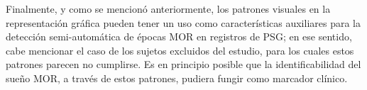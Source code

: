Finalmente, y como se mencionó anteriormente, los patrones visuales en la representación 
gráfica pueden tener un uso como características auxiliares para la detección 
semi-automática de épocas MOR en registros de PSG; en ese sentido, cabe mencionar el caso de 
los sujetos excluidos del estudio, para los cuales estos patrones parecen no cumplirse. 
Es en principio posible que la identificabilidad del sueño MOR, a través de estos patrones, 
pudiera fungir como marcador clínico.

